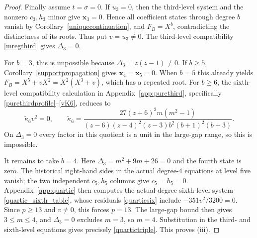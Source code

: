\documentclass[12pt]{article}
\theoremstyle{remark}
\begin{document}
\begin{proof}
Finally assume $t=\sigma=0$.  If $u_3=0$, then the third-level system
and the nonzero $c_3,h_3$ minor give $\mathbf x_3=0$.  Hence all
coefficient states through degree $b$ vanish by
Corollary~\ref{uniquecontinuation}, and $F_B=X^b$, contradicting the
distinctness of its roots.  Thus put $v=u_3\ne0$.  The third-level
compatibility \eqref{mregthird} gives $\Delta_3=0$.

For $b=3$, this is impossible because $\Delta_3=z(z-1)\ne0$.  If
$b\ge5$, Corollary~\ref{supportpropagation} gives
$\mathbf x_4=\mathbf x_5=0$.  When $b=5$ this already yields
$F_B=X^5+vX^2=X^2(X^3+v)$, which has a repeated root.  For $b\ge6$, the sixth-level compatibility
calculation in Appendix~\ref{app:purethird}, specifically
\eqref{purethirdprofile}--\eqref{vK6}, reduces to
\[
 \widetilde\kappa_6v^2=0,
 \qquad
 \widetilde\kappa_6=
 \frac{27(z+6)^2m(m^2-1)}
 {(z-6)(z-4)^2(z-3)b^2(b+1)^2(b+3)}.
\]
On $\Delta_3=0$ every factor in this quotient is a unit in the
large-gap range, so this is impossible.

It remains to take $b=4$.  Here $\Delta_3=m^2+9m+26=0$ and the
fourth state is zero.  The historical right-hand sides in the actual
degree-$4$ equations at level five vanish; the two independent
$c_5,h_5$ columns give $c_5=h_5=0$.  Appendix~\ref{app:quartic}
then computes the actual-degree sixth-level system
\eqref{quartic_sixth_table}, whose residuals \eqref{quarticsix} include
$-351v^2/3200=0$.  Since $p\ge13$ and $v\ne0$, this forces $p=13$.  The large-gap bound
then gives $3\le m\le4$, and $\Delta_3=0$ excludes $m=3$, so $m=4$.
Substitution in the third- and sixth-level equations gives precisely
\eqref{quartictriple}.  This proves \textup{(iii)}.
\end{proof}
\end{document}
